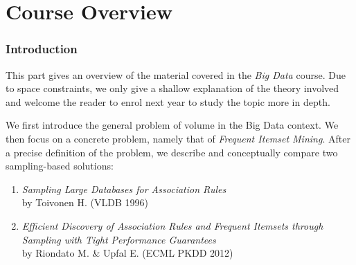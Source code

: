 \documentclass[11pt]{sigplanconf}
\renewcommand\it{\textit}
\begin{document}

\part{Course Overview}\label{part1}
\section{Introduction}
This part gives an overview of the material covered in the \textit{Big Data} course. Due to space constraints, we only give a shallow explanation of the theory involved and welcome the reader to enrol next year to study the topic more in depth.

We first introduce the general problem of volume in the Big Data context. We then focus on a concrete problem, namely that of \it{Frequent Itemset Mining}. After a precise definition of the problem, we describe and conceptually compare two sampling-based solutions:
\begin{enumerate}
\item \it{Sampling Large Databases for Association Rules} \\
by Toivonen H. (VLDB 1996)
\item \it{Efficient Discovery of Association Rules and Frequent Itemsets through Sampling with Tight Performance Guarantees} \\
by Riondato M. \& Upfal E. (ECML PKDD 2012)
\end{enumerate}
\end{document}
